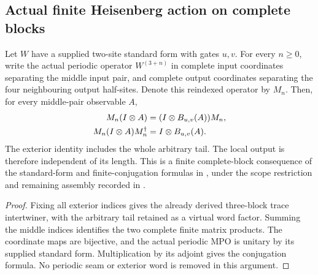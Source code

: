 \subsection{Actual finite Heisenberg action on complete blocks}
\label{sec:mpu_finite_heisenberg}

\begin{lemma}
    \label{thm:mpu_finite_heisenberg_complete_block}
    \leanok
    Let $W$ have a supplied two-site standard form with gates $u,v$.
    For every $n\ge0$, write the actual periodic operator $W^{(3+n)}$
    in complete input coordinates separating the middle input pair,
    and complete output coordinates separating the four neighbouring
    output half-sites. Denote this reindexed operator by $M_n$.
    Then, for every middle-pair observable $A$,
    \begin{align}
        M_n(I\otimes A)            & =(I\otimes B_{u,v}(A))M_n,\notag \\
        M_n(I\otimes A)M_n^\dagger & =I\otimes B_{u,v}(A).
        \label{eq:mpu_finite_heisenberg_complete_block}
    \end{align}
    The exterior identity includes the whole arbitrary tail. The local
    output is therefore independent of its length. This is a finite
    complete-block consequence of
    the standard-form and finite-conjugation formulas in
    \cite[lines~603--622 and~2300--2306]{Cirac2017MPU}, under the scope restriction and remaining
    assembly recorded in \cite{gap:mpu_qca_complete_block_heisenberg_scope}.
\end{lemma}
\begin{proof}\leanok
    Fixing all exterior indices gives the already derived three-block
    trace intertwiner, with the arbitrary tail retained as a virtual word
    factor. Summing the middle indices identifies the two complete finite
    matrix products. The coordinate maps are bijective, and the actual
    periodic MPO is unitary by its supplied standard form. Multiplication
    by its adjoint gives the conjugation formula. No periodic seam or
    exterior word is removed in this argument.
\end{proof}

